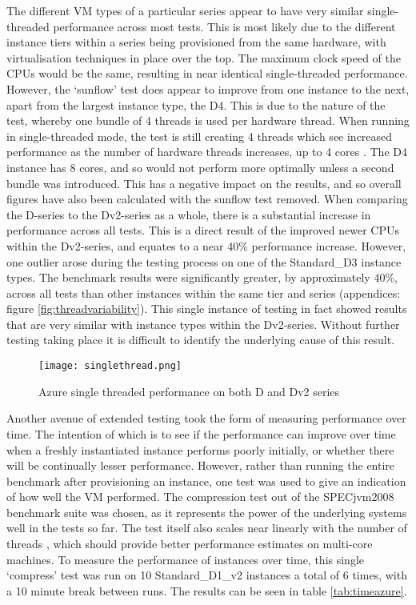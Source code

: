 \documentclass[conference]{IEEEtran}
\begin{document}
The different VM types of a particular series appear to have very similar single-threaded performance across most tests. This is most likely due to the different instance tiers within a series being provisioned from the same hardware, with virtualisation techniques in place over the top. The maximum clock speed of the CPUs would be the same, resulting in near identical single-threaded performance. However, the `sunflow' test does appear to improve from one instance to the next, apart from the largest instance type, the D4. This is due to the nature of the test, whereby one bundle of 4 threads is used per hardware thread. When running in single-threaded mode, the test is still creating 4 threads which see increased performance as the number of hardware threads increases, up to 4 cores \cite{shiv2009specjvm2008}. The D4 instance has 8 cores, and so would not perform more optimally unless a second bundle was introduced. This has a negative impact on the results, and so overall figures have also been calculated with the sunflow test removed. When comparing the D-series to the Dv2-series as a whole, there is a substantial increase in performance across all tests. This is a direct result of the improved newer CPUs within the Dv2-series, and equates to a near 40\% performance increase. However, one outlier arose during the testing process on one of the Standard\_D3 instance types. The benchmark results were significantly greater, by approximately 40\%, across all tests than other instances within the same tier and series (appendices: figure \ref{fig:threadvariability}). This single instance of testing in fact showed results that are very similar with instance types within the Dv2-series. Without further testing taking place it is difficult to identify the underlying cause of this result.

\begin{figure}[ht]
  \centering
  \texttt{[image: singlethread.png]}
  \caption{Azure single threaded performance on both D and Dv2 series}
  \label{fig:threadchart}
\end{figure}

Another avenue of extended testing took the form of measuring performance over time. The intention of which is to see if the performance can improve over time when a freshly instantiated instance performs poorly initially, or whether there will be continually lesser performance. However, rather than running the entire benchmark after provisioning an instance, one test was used to give an indication of how well the VM performed. The compression test out of the SPECjvm2008 benchmark suite was chosen, as it represents the power of the underlying systems well in the tests so far. The test itself also scales near linearly with the number of threads \cite{shiv2009specjvm2008}, which should provide better performance estimates on multi-core machines. To measure the performance of instances over time, this single `compress' test was run on 10 Standard\_D1\_v2 instances a total of 6 times, with a 10 minute break between runs. The results can be seen in table \ref{tab:timeazure}.
\end{document}

